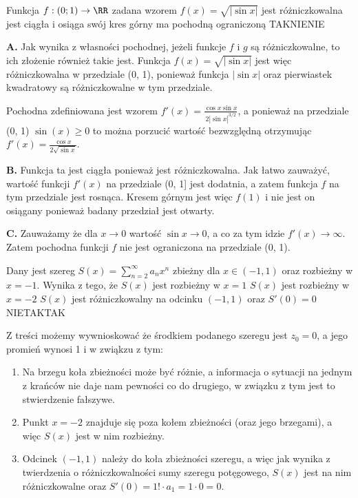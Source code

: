 \begin{solutions}
    \textbf{}

    \sol Funkcja $f:(0;1) \to \RR$ zadana wzorem $f(x) = \sqrt{|\sin{x}|}$
    \answerss
    {jest różniczkowalna}
    {jest ciągła i osiąga swój kres górny}
    {ma pochodną ograniczoną}
    {TAK}{NIE}{NIE}

    \textbf{A.}  Jak wynika z własności pochodnej, jeżeli funkcje $f$ i $g$ są różniczkowalne, to ich złożenie również takie jest. Funkcja $f(x) = \sqrt{|\sin{x}|}$ jest więc różniczkowalna w przedziale (0, 1), ponieważ funkcja $|\sin{x}|$ oraz pierwiastek kwadratowy są różniczkowalne w tym przedziale.
    
    Pochodna zdefiniowana jest wzorem $f'(x) = \frac{\cos{x} \sin{x}}{2 |\sin{x}|^{3/2}}$, a ponieważ na przedziale (0, 1) $\sin(x) \ge 0$ to można porzucić wartość bezwzględną otrzymując $f'(x) = \frac{\cos{x} }{2 \sqrt{\sin{x}}}$.
    
    \textbf{B.} Funkcja ta jest ciągła ponieważ jest różniczkowalna. Jak łatwo zauważyć, wartość funkcji $f'(x)$ na przedziale (0, 1] jest dodatnia, a zatem funkcja $f$ na tym przedziale jest rosnąca. Kresem górnym jest więc $f(1)$ i nie jest on osiągany ponieważ badany przedział jest otwarty.

    \textbf{C.} Zauważamy że dla $x \rightarrow 0$ wartość $\sin{x} \rightarrow 0$, a co za tym idzie $f'(x) \rightarrow \infty$. Zatem pochodna funkcji $f$ nie jest ograniczona na przedziale (0, 1).
    
    \sol Dany jest szereg $S(x) = \sum_{n = 2}^{\infty} a_n x^n$ zbieżny dla $x \in (-1, 1)$ oraz rozbieżny w $x = -1$. Wynika z tego, że
    \answerss
    {$S(x)$ jest rozbieżny w $x = 1$}
    {$S(x)$ jest rozbieżny w $x = -2$}
    {$S(x)$ jest różniczkowalny na odcinku $(-1, 1)$ oraz $S'(0) = 0$}
    {NIE}{TAK}{TAK}

    Z treści możemy wywnioskować że środkiem podanego szeregu jest $z_0 = 0$, a jego promień wynosi 1 i w  zwiąkzu z tym:
    \begin{enumerate}[\bf A.]
        \item Na brzegu koła zbieżności może być różnie, a informacja o sytuacji na jednym z krańców nie daje nam pewności co do drugiego, w związku z tym jest to stwierdzenie fałszywe.
        \item Punkt $x=-2$ znajduje się poza kołem zbieżności (oraz jego brzegami), a więc $S(x)$ jest w nim rozbieżny.
        \item Odcinek $(-1, 1)$ należy do koła zbieżności szeregu, a więc jak wynika z twierdzenia o różniczkowalności sumy szeregu potęgowego, $S(x)$ jest na nim różniczkowalne oraz $S'(0) = 1! \cdot a_1 = 1 \cdot 0 = 0$.
    \end{enumerate} 


\end{solutions}
